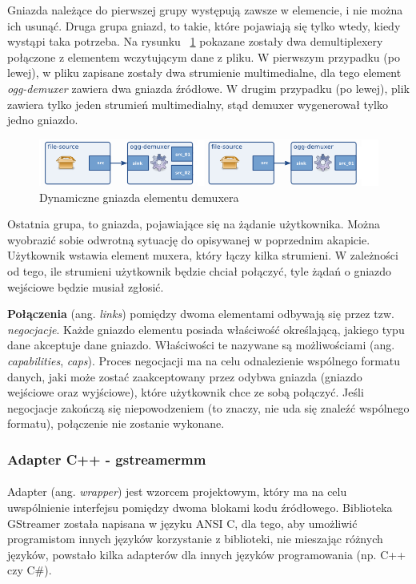 \documentclass[12pt]{article}
\begin{document}
Gniazda należące do pierwszej grupy występują zawsze w elemencie, i nie można ich usunąć.
Druga grupa gniazd, to takie, które pojawiają się tylko wtedy, kiedy wystąpi taka potrzeba. Na rysunku ~\ref{fig:requestPadsDemux} pokazane zostały dwa demultiplexery połączone z elementem wczytującym dane z pliku. W pierwszym przypadku (po lewej), w pliku zapisane zostały dwa strumienie multimedialne, dla tego element \textit{ogg-demuxer} zawiera dwa gniazda źródłowe. W drugim przypadku (po lewej), plik zawiera tylko jeden strumień multimedialny, stąd demuxer wygenerował tylko jedno gniazdo.
\begin{figure}[H]
  \includegraphics[width=150mm]{img/request-pads-demux.png}
  \caption{Dynamiczne gniazda elementu demuxera \cite{gstmainpage}}
  \label{fig:requestPadsDemux}
\end{figure}
Ostatnia grupa, to gniazda, pojawiające się na żądanie użytkownika. Można wyobrazić sobie odwrotną sytuację do opisywanej w poprzednim akapicie. Użytkownik wstawia element muxera, który łączy kilka strumieni. W zależności od tego, ile strumieni użytkownik będzie chciał połączyć, tyle żądań o gniazdo wejściowe będzie musiał zgłosić.

\textbf{Połączenia} (ang. \textit{links}) pomiędzy dwoma elementami odbywają się przez tzw. \textit{negocjacje}. Każde gniazdo elementu posiada właściwość określającą, jakiego typu dane akceptuje dane gniazdo. Właściwości te nazywane są możliwościami (ang. \textit{capabilities}, \textit{caps}). Proces negocjacji ma na celu odnalezienie wspólnego formatu danych, jaki może zostać zaakceptowany przez odybwa gniazda (gniazdo wejściowe oraz wyjściowe), które użytkownik chce ze sobą połączyć. Jeśli negocjacje zakończą się niepowodzeniem (to znaczy, nie uda się znaleźć wspólnego formatu), połączenie nie zostanie wykonane.

\subsubsection{Adapter C++ - gstreamermm}
\paragraph{}
Adapter (ang. \textit{wrapper}) jest wzorcem projektowym, który ma na celu uwspólnienie interfejsu pomiędzy dwoma blokami kodu źródłowego. Biblioteka GStreamer została napisana w języku ANSI C, dla tego, aby umożliwić programistom innych języków korzystanie z biblioteki, nie mieszając różnych języków, powstało kilka adapterów dla innych języków programowania (np. C++ czy C\#).
\end{document}
